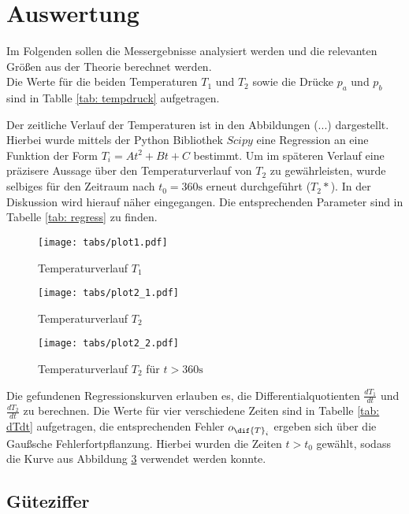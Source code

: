 \section{Auswertung}
Im Folgenden sollen die Messergebnisse analysiert werden und die relevanten Größen aus der Theorie berechnet werden. \\
Die Werte für die beiden Temperaturen $T_1$ und $T_2$ sowie die Drücke $p_a$ und $p_b$ sind in Tablle \ref{tab: tempdruck} aufgetragen.
\FloatBarrier

\FloatBarrier
Der zeitliche Verlauf der Temperaturen ist in den Abbildungen (...) dargestellt. Hierbei wurde mittels der Python Bibliothek $Scipy$ eine %
Regression an eine Funktion der Form $T_i = A t^2 + B t + C$ bestimmt. Um im späteren Verlauf eine präzisere Aussage über den Temperaturverlauf
von $T_2$ zu gewährleisten, wurde selbiges für den Zeitraum nach $t_0 = 360 \si{\second}$ erneut durchgeführt ($T_2*$). In der Diskussion wird hierauf näher eingegangen. Die entsprechenden
Parameter sind in Tabelle \ref{tab: regress} zu finden. \\


\begin{figure}
  \centering
  \texttt{[image: tabs/plot1.pdf]}
  \caption{Temperaturverlauf $T_1$}
  \label{fig: plot1}
\end{figure}

\begin{figure}
  \centering
  \texttt{[image: tabs/plot2\_1.pdf]}
  \caption{Temperaturverlauf $T_2$}
  \label{fig: plot2}
\end{figure}

\begin{figure}
  \centering
  \texttt{[image: tabs/plot2\_2.pdf]}
  \caption{Temperaturverlauf $T_2$ für $t > 360 \si{\second}$}
  \label{fig: plot2*}
\end{figure}


Die gefundenen Regressionskurven erlauben es, die Differentialquotienten $\frac{dT_1}{dt}$ und $\frac{dT_2}{dt}$ zu berechnen. Die Werte für vier verschiedene  Zeiten sind %
in Tabelle \ref{tab: dTdt} aufgetragen, die entsprechenden Fehler $o_{\dif{T}_i}$ ergeben sich über die Gaußsche Fehlerfortpflanzung. Hierbei wurden die Zeiten $t > t_0$ gewählt, sodass die Kurve aus Abbildung \ref{fig: plot2*} verwendet werden konnte. %

\subsection{Güteziffer}

